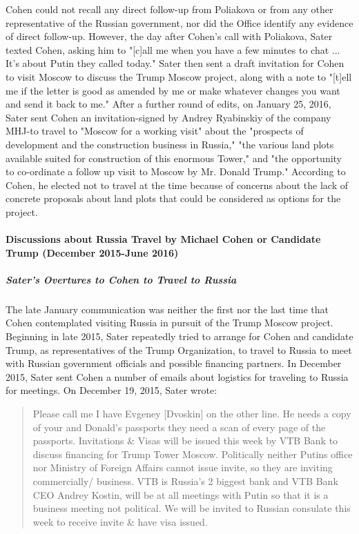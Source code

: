 Cohen could not recall any direct follow-up from Poliakova or from any other representative of the Russian government, nor did the Office identify any evidence of direct follow-up.
However, the day after Cohen's call with Poliakova, Sater texted Cohen, asking him to "[c]all me when you have a few minutes to chat ... It's about Putin they called today."%
Sater then sent a  draft invitation for Cohen to visit Moscow to discuss the Trump Moscow project, %
along with a note to "[t]ell me if the letter is good as amended by me or make whatever changes you want and send it  back to me."%
After a  further round of edits, on January 25, 2016,  Sater sent Cohen an invitation-signed by Andrey Ryabinskiy of the company MHJ-to travel to "Moscow for a working visit" about the "prospects of development and the construction business in Russia," "the various land plots available suited for construction of this enormous Tower," and "the opportunity to co-ordinate a follow up visit to Moscow by Mr. Donald Trump."%
According to Cohen,  he elected not to travel at the time because of concerns about the lack of concrete proposals about land plots that could be considered as options for the project.%

\paragraph{Discussions about Russia Travel by Michael Cohen or Candidate Trump (December 2015-June 2016)}

\subparagraph{Sater's Overtures to Cohen to Travel to Russia}

The late January communication was neither the first nor the last time that Cohen contemplated visiting Russia in pursuit of the Trump Moscow project.
Beginning in late 2015, Sater repeatedly tried to arrange for Cohen and candidate Trump, as representatives of the Trump Organization, to travel to Russia to meet with Russian government officials and possible financing partners.
In December 2015, Sater sent Cohen a number of emails about logistics for traveling to Russia for meetings.%
On December 19, 2015, Sater wrote:

\begin{quote}
Please call me I  have Evgeney [Dvoskin] on the other line.%
He needs a copy of your and Donald's passports they need a scan of every page of the passports.
Invitations & Visas will be issued this week by VTB Bank to discuss financing for Trump Tower Moscow. Politically neither Putins office nor Ministry of Foreign Affairs cannot issue invite, so they are inviting commercially/ business.
VTB is Russia's 2 biggest bank and VTB Bank CEO Andrey Kostin, will be at all meetings with Putin so that it is a business meeting not political.
We will be invited to Russian consulate this week to receive invite & have visa issued.%
\end{quote}

